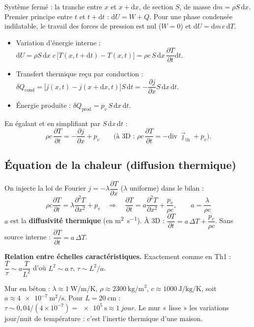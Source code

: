 \documentclass[11pt,a4paper]{article}
\newcommand{\jth}{\vec{\jmath}_{\mathrm{th}}}
\renewcommand{\div}{\mathrm{div}\,}
\newcommand{\dd}{\mathrm{d}}
\newcommand{\pd}[2]{\dfrac{\partial #1}{\partial #2}}
\newcommand{\pdd}[2]{\dfrac{\partial^2 #1}{\partial #2^2}}
\begin{document}
\begin{demo}[title={Démonstration : bilan local d'énergie à 1D (premier principe)}]
Système fermé : la tranche entre $x$ et $x+\dd x$, de section $S$, de masse
$\dd m=\rho S\,\dd x$. Premier principe entre $t$ et $t+\dd t$ :
$\dd U=W+Q$. Pour une phase condensée indilatable, le travail des forces de pression est
nul ($W=0$) et $\dd U=\dd m\,c\,\dd T$.
\begin{itemize}[leftmargin=1.5em]
  \item Variation d'énergie interne :
        $\dd U=\rho S\,\dd x\;c\,\big[T(x,t+\dd t)-T(x,t)\big]=\rho c\,S\,\dd x\,\pd{T}{t}\dd t.$
  \item Transfert thermique reçu par conduction :
        $\delta Q_{\text{cond}}=\big[j(x,t)-j(x+\dd x,t)\big]S\,\dd t=-\pd{j}{x}S\,\dd x\,\dd t.$
  \item Énergie produite : $\delta Q_{\text{prod}}=p_v\,S\,\dd x\,\dd t$.
\end{itemize}
En égalant et en simplifiant par $S\,\dd x\,\dd t$ :
\[ \boxed{\rho c\,\pd{T}{t}=-\pd{j}{x}+p_v} \qquad
   \text{(à 3D : } \rho c\,\pd{T}{t}=-\div\jth+p_v\text{).} \]
\end{demo}

\subsection{Équation de la chaleur (diffusion thermique)}

\begin{demo}[title={Démonstration : équation de diffusion thermique en cartésiennes 1D}]
On injecte la loi de Fourier $j=-\lambda\pd{T}{x}$ ($\lambda$ uniforme) dans le bilan :
\[ \rho c\pd{T}{t}=\lambda\pdd{T}{x}+p_v
   \quad\Longrightarrow\quad
   \boxed{\pd{T}{t}=a\pdd{T}{x}+\dfrac{p_v}{\rho c}},
   \qquad \boxed{a=\dfrac{\lambda}{\rho c}} \]
$a$ est la \textbf{diffusivité thermique} (en \si{\square\metre\per\second}). À 3D :
$\pd{T}{t}=a\,\Delta T+\dfrac{p_v}{\rho c}$. Sans source interne : $\pd{T}{t}=a\,\Delta T$.
\end{demo}

\textbf{Relation entre échelles caractéristiques.} Exactement comme en Th1 :
$\dfrac{T}{\tau}\sim a\dfrac{T}{L^2}$ d'où $\boxed{L^2\sim a\,\tau}$, $\tau\sim L^2/a$.

\begin{exemple}
Mur en béton : $\lambda\approx\SI{1}{\watt\per\metre\per\kelvin}$,
$\rho\approx\SI{2300}{\kilo\gram\per\cubic\metre}$,
$c\approx\SI{1000}{\joule\per\kilo\gram\per\kelvin}$, soit
$a\approx\SI{4e-7}{\square\metre\per\second}$. Pour $L=\SI{20}{\centi\metre}$ :
$\tau\sim 0{,}04/(4\times10^{-7})=\SI{e5}{\second}\approx\SI{1}{jour}$. Le mur « lisse »
les variations jour/nuit de température : c'est l'inertie thermique d'une maison.
\end{exemple}
\end{document}
